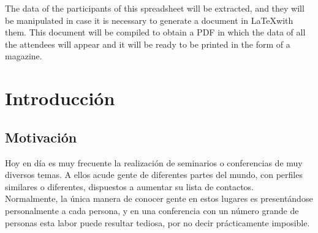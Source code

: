 \documentclass[a4paper, 12pt]{book}
\begin{document}
The data of the participants of this spreadsheet will be extracted, and they will be manipulated in case it is necessary to generate a document in \LaTeX with them. This document will be compiled to obtain a PDF in which the data of all the attendees will appear and it will be ready to be printed in the form of a magazine.




\tableofcontents
\cleardoublepage
\listoffigures %



\cleardoublepage
\chapter{Introducción}
\label{chap:intro} %

\section{Motivación}
\label{sec:motivacion}
Hoy en día es muy frecuente la realización de seminarios o conferencias de muy diversos temas. A ellos acude gente de diferentes partes del mundo, con perfiles similares o diferentes, dispuestos a aumentar su lista de contactos. \\

Normalmente, la única manera de conocer gente en estos lugares es presentándose personalmente a cada persona, y en una conferencia con un número grande de personas esta labor puede resultar tediosa, por no decir prácticamente imposible.\\
\end{document}

